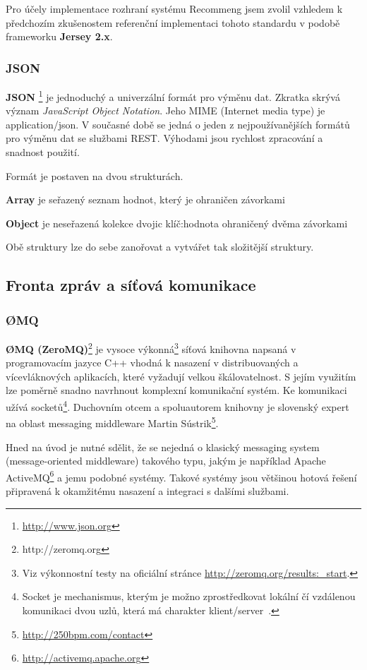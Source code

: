 \documentclass[thesis=M,czech]{FITthesis}[2014/05/07]
\begin{document}
Pro účely implementace rozhraní systému Recommeng jsem zvolil vzhledem k předchozím zkušenostem referenční implementaci tohoto standardu v podobě frameworku \textbf{Jersey 2.x}. 

\subsubsection{JSON}
\textbf{JSON }\footnote{\url{http://www.json.org}} je jednoduchý a univerzální formát pro výměnu dat. Zkratka skrývá význam \emph{JavaScript Object Notation}. Jeho MIME (Internet media type) je application/json. V současné době se jedná o jeden z nejpoužívanějších formátů pro výměnu dat se službami REST. Výhodami jsou rychlost zpracování a snadnost použití.

Formát je postaven na dvou strukturách. 

\begin{description}
	\item \textbf{Array} je seřazený seznam hodnot, který je ohraničen závorkami
	\item \textbf{Object} je neseřazená kolekce dvojic klíč:hodnota ohraničený dvěma závorkami
\end{description}

Obě struktury lze do sebe zanořovat a vytvářet tak složitější struktury.

\subsection{Fronta zpráv a síťová komunikace}

\subsubsection{ØMQ}
\textbf{ØMQ (ZeroMQ)}\footnote{http://zeromq.org} je vysoce výkonná\footnote{Viz výkonnostní testy na oficiální stránce \url{http://zeromq.org/results:_start}.} síťová knihovna napsaná v programovacím jazyce C++ vhodná k nasazení v distribuovaných a vícevláknových aplikacích, které vyžadují velkou škálovatelnost. S jejím využitím lze poměrně snadno navrhnout komplexní komunikační systém. Ke komunikaci užívá socketů\footnote{Socket je mechanismus, kterým je možno zprostředkovat lokální čí vzdálenou komunikaci dvou uzlů, která má charakter klient/server~\cite{socket}.}. Duchovním otcem a spoluautorem knihovny je slovenský expert na oblast messaging middleware Martin Sústrik\footnote{\url{http://250bpm.com/contact}}.

Hned na úvod je nutné sdělit, že se nejedná o klasický messaging system (message-oriented middleware) takového typu, jakým je například Apache ActiveMQ\footnote{\url{http://activemq.apache.org}} a jemu podobné systémy. Takové systémy jsou většinou hotová řešení připravená k okamžitému nasazení a integraci s dalšími službami. 
\end{document}
